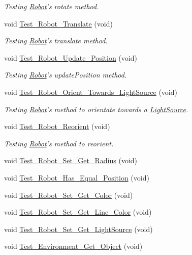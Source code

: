 \begin{DoxyCompactItemize}
\begin{DoxyCompactList}\small\item\em Testing \hyperlink{classRobot}{Robot}'s rotate method. \end{DoxyCompactList}\item 
void \hyperlink{classUnitTests_a3e81b6cf5440b7cc4738bf5af191d6f6}{Test\-\_\-\-Robot\-\_\-\-Translate} (void)
\begin{DoxyCompactList}\small\item\em Testing \hyperlink{classRobot}{Robot}'s translate method. \end{DoxyCompactList}\item 
void \hyperlink{classUnitTests_a66a1aa2cbbe06040a326d1c285c1c592}{Test\-\_\-\-Robot\-\_\-\-Update\-\_\-\-Position} (void)
\begin{DoxyCompactList}\small\item\em Testing \hyperlink{classRobot}{Robot}'s update\-Position method. \end{DoxyCompactList}\item 
void \hyperlink{classUnitTests_a4d0facc3de8dbffc4aca94f39fbb3606}{Test\-\_\-\-Robot\-\_\-\-Orient\-\_\-\-Towards\-\_\-\-Light\-Source} (void)
\begin{DoxyCompactList}\small\item\em Testing \hyperlink{classRobot}{Robot}'s method to orientate towards a \hyperlink{classLightSource}{Light\-Source}. \end{DoxyCompactList}\item 
void \hyperlink{classUnitTests_ad5efae41363cefb10453f619947606df}{Test\-\_\-\-Robot\-\_\-\-Reorient} (void)
\begin{DoxyCompactList}\small\item\em Testing \hyperlink{classRobot}{Robot}'s method to reorient. \end{DoxyCompactList}\item 
void \hyperlink{classUnitTests_a4cc7fdf74065cbcb14f5ddd9a22036e3}{Test\-\_\-\-Robot\-\_\-\-Set\-\_\-\-Get\-\_\-\-Radius} (void)
\item 
void \hyperlink{classUnitTests_aa38865bc83fb26a49ddfc8a81e9ff02a}{Test\-\_\-\-Robot\-\_\-\-Has\-\_\-\-Equal\-\_\-\-Position} (void)
\item 
void \hyperlink{classUnitTests_adf087d8710f3b028a920fcabb9f26b55}{Test\-\_\-\-Robot\-\_\-\-Set\-\_\-\-Get\-\_\-\-Color} (void)
\item 
void \hyperlink{classUnitTests_a679ba34905284719adba02989471fb85}{Test\-\_\-\-Robot\-\_\-\-Set\-\_\-\-Get\-\_\-\-Line\-\_\-\-Color} (void)
\item 
void \hyperlink{classUnitTests_a1dad88867c02848383f63814c5d67470}{Test\-\_\-\-Robot\-\_\-\-Set\-\_\-\-Get\-\_\-\-Light\-Source} (void)
\item 
void \hyperlink{classUnitTests_a65016cd0b994d5d73798b79ab528fe48}{Test\-\_\-\-Environment\-\_\-\-Get\-\_\-\-Object} (void)
\end{DoxyCompactItemize}


